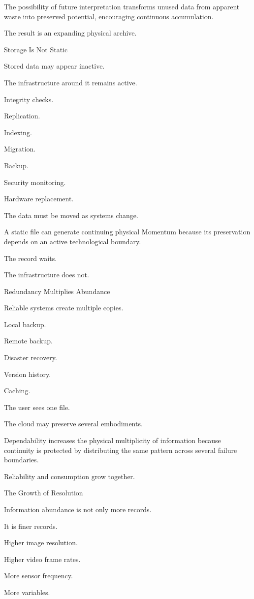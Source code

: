 The possibility of future interpretation transforms unused data from apparent waste into preserved potential, encouraging continuous accumulation.

The result is an expanding physical archive.

Storage Is Not Static

Stored data may appear inactive.

The infrastructure around it remains active.

Integrity checks.

Replication.

Indexing.

Migration.

Backup.

Security monitoring.

Hardware replacement.

The data must be moved as systems change.

A static file can generate continuing physical Momentum because its preservation depends on an active technological boundary.

The record waits.

The infrastructure does not.

Redundancy Multiplies Abundance

Reliable systems create multiple copies.

Local backup.

Remote backup.

Disaster recovery.

Version history.

Caching.

The user sees one file.

The cloud may preserve several embodiments.

Dependability increases the physical multiplicity of information because continuity is protected by distributing the same pattern across several failure boundaries.

Reliability and consumption grow together.

The Growth of Resolution

Information abundance is not only more records.

It is finer records.

Higher image resolution.

Higher video frame rates.

More sensor frequency.

More variables.

